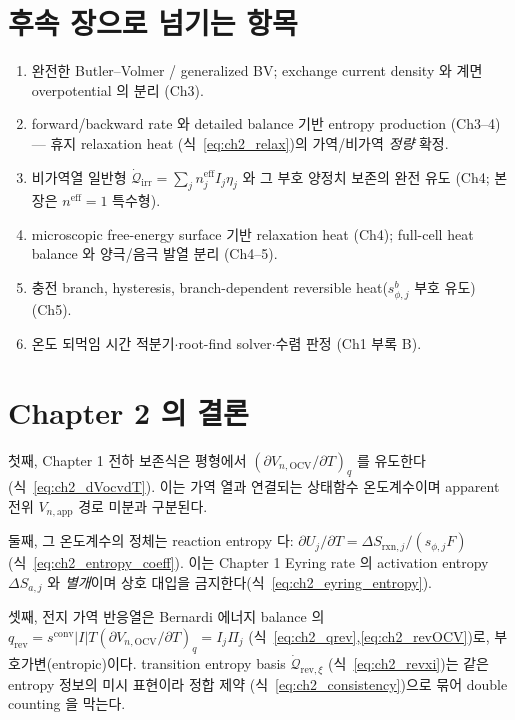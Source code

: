 \documentclass[11pt,a4paper]{article}
\newcommand{\eff}{\mathrm{eff}}
\newcommand{\app}{\mathrm{app}}
\newcommand{\OCV}{\mathrm{OCV}}
\newcommand{\irr}{\mathrm{irr}}
\newcommand{\rev}{\mathrm{rev}}
\newcommand{\rxn}{\mathrm{rxn}}
\newcommand{\conv}{\mathrm{conv}}
\begin{document}
\section{후속 장으로 넘기는 항목}\label{sec:ch2_transmit}
\begin{enumerate}[label=\arabic*),leftmargin=2.0em]
\item 완전한 Butler--Volmer / generalized BV; exchange current density 와 계면 overpotential 의 분리 (Ch3).
\item forward/backward rate 와 detailed balance 기반 entropy production (Ch3--4) — 휴지 relaxation heat
  (식~\eqref{eq:ch2_relax})의 가역/비가역 \emph{정량} 확정.
\item 비가역열 일반형 $\dot{\mathcal Q}_{\irr}=\sum_j n_j^{\eff}I_j\eta_j$ 와 그 부호 양정치 보존의 완전 유도
  (Ch4; 본 장은 $n^\eff=1$ 특수형).
\item microscopic free-energy surface 기반 relaxation heat (Ch4); full-cell heat balance 와 양극/음극 발열
  분리 (Ch4--5).
\item 충전 branch, hysteresis, branch-dependent reversible heat($s_{\phi,j}^b$ 부호 유도) (Ch5).
\item 온도 되먹임 시간 적분기$\cdot$root-find solver$\cdot$수렴 판정 (Ch1 부록 B).
\end{enumerate}

\section{Chapter 2 의 결론}\label{sec:ch2_concl}
첫째, Chapter 1 전하 보존식은 평형에서 $(\partial V_{n,\OCV}/\partial T)_q$ 를 유도한다(식~\eqref{eq:ch2_dVocvdT}).
이는 가역 열과 연결되는 상태함수 온도계수이며 apparent 전위 $V_{n,\app}$ 경로 미분과 구분된다.

둘째, 그 온도계수의 정체는 reaction entropy 다: $\partial U_j/\partial T=\Delta S_{\rxn,j}/(s_{\phi,j}F)$
(식~\eqref{eq:ch2_entropy_coeff}). 이는 Chapter 1 Eyring rate 의 activation entropy $\Delta S_{a,j}$ 와
\emph{별개}이며 상호 대입을 금지한다(식~\eqref{eq:ch2_eyring_entropy}).

셋째, 전지 가역 반응열은 Bernardi 에너지 balance 의 $q_\rev=s^{\conv}|I|T(\partial V_{n,\OCV}/\partial T)_q
=I_j\Pi_j$ (식~\eqref{eq:ch2_qrev},\eqref{eq:ch2_revOCV})로, 부호가변(entropic)이다. transition entropy basis
$\dot{\mathcal Q}_{\rev,\xi}$ (식~\eqref{eq:ch2_revxi})는 같은 entropy 정보의 미시 표현이라 정합 제약
(식~\eqref{eq:ch2_consistency})으로 묶어 double counting 을 막는다.
\end{document}

